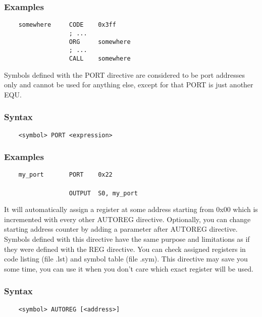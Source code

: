     \subsubsection{Examples}
        \verb'    somewhere     CODE    0x3ff'\\
        \verb'                  ; ...'\\
        \verb'                  ORG     somewhere'\\
        \verb'                  ; ...'\\
        \verb'                  CALL    somewhere'

    Symbols defined with the PORT directive are considered to be port addresses only and cannot be used for anything else, except for that PORT is just another EQU.

    \subsubsection{Syntax}
        \verb'    <symbol> PORT <expression>'

    \subsubsection{Examples}
        \verb'    my_port       PORT    0x22'\\
        \verb''\\
        \verb'                  OUTPUT  S0, my_port'

    It will automatically assign a register at some address starting from 0x00 which is incremented with every other AUTOREG directive. Optionally, you can change starting address counter by adding a parameter after AUTOREG directive. Symbols defined with this directive have the same purpose and limitations as if they were defined with the REG directive. You can check assigned registers in code listing (file .lst) and symbol table (file .sym). This directive may save you some time, you can use it when you don't care which exact register will be used.

    \subsubsection{Syntax}
        \verb'    <symbol> AUTOREG [<address>]'

